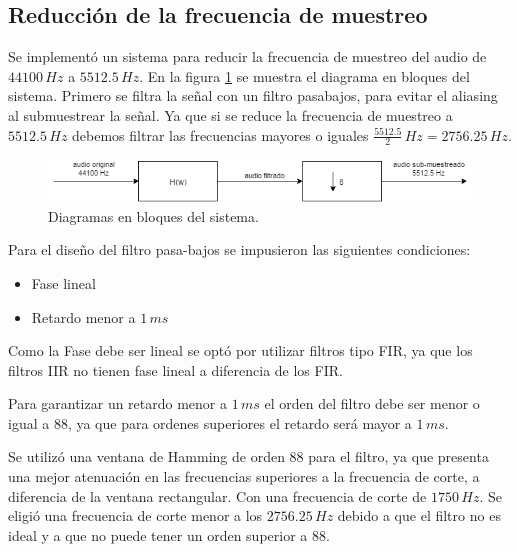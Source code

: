 \documentclass[10pt,spanish,a4paper,openany,notitlepage]{article}
\begin{document}
\subsection{Reducción de la frecuencia de muestreo}

Se implementó un sistema para reducir la frecuencia de muestreo del audio
de $44100\, \unit{Hz}$ a $5512.5\, \unit{Hz}$. En la figura \ref{fig:filtro_bloque}
se muestra el diagrama en bloques del sistema.
Primero se filtra la señal con un filtro pasabajos, para evitar el aliasing
al submuestrear la señal. Ya que si se reduce la frecuencia de muestreo a
$5512.5\, \unit{Hz}$ debemos filtrar las frecuencias mayores o iguales 
$\frac{5512.5}{2}\, \unit{Hz} = 2756.25\, \unit{Hz}$.


\begin{figure}[H] %
\begin{center}
\includegraphics[scale=0.8]{./imagenes/filtro_bloque.png}
\caption{Diagramas en bloques del sistema.}
 \label{fig:filtro_bloque}
\end{center}
\end{figure}

Para el diseño del filtro pasa-bajos se impusieron las siguientes condiciones:

\begin{itemize}
\item Fase lineal
\item Retardo menor a $1\, \unit{ms}$
\end{itemize}

Como la Fase debe ser lineal se optó por utilizar filtros tipo FIR,
ya que los filtros IIR no tienen fase lineal a diferencia de los FIR.

Para garantizar un retardo menor a $1\, \unit{ms}$ el orden del filtro
debe ser menor o igual a 88, ya que para ordenes superiores el retardo
será mayor a $1\, \unit{ms}$.

Se utilizó una ventana de Hamming de orden 88 para el filtro, ya que presenta
una mejor atenuación en las frecuencias superiores a la frecuencia de
corte, a diferencia de la ventana rectangular. Con una frecuencia de
corte de $1750\, \unit{Hz}$. Se eligió una frecuencia de corte
menor a los $2756.25\, \unit{Hz}$ debido a que el filtro no es ideal
y a que no puede tener un orden superior a 88.
\end{document}
